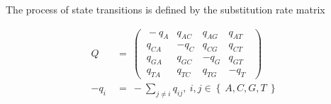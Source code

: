 
The process of state transitions is defined by the substitution rate matrix %

\begin{align}
    Q ~&=~
     \begin{pmatrix}
     ~-q_{A}   &   q_{AC}   &   q_{AG}   &   q_{AT}~~ \\
     ~q_{CA}   &  -q_{C}    &   q_{CG}   &   q_{CT}~~ \\
     ~q_{GA}   &   q_{GC}   &  -q_{G}    &   q_{GT}~~ \\
     ~q_{TA}   &   q_{TC}   &   q_{TG}   &  -q_{T}~~
     \end{pmatrix}
    \\[1.5em]
    - q_{i} ~&=~ - \sum_{j \neq i} q_{ij}, ~ i,j \in \left\{~ A, C, G, T ~\right\}
\end{align}

